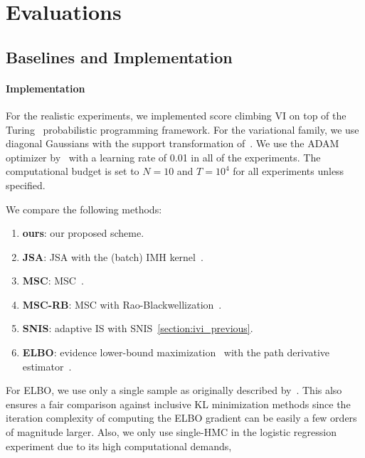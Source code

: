 \vspace{-0.05in}
\section{Evaluations}\label{section:eval}

\vspace{-0.05in}
\subsection{Baselines and Implementation}
\vspace{-0.05in}
\paragraph{Implementation}
For the realistic experiments, we implemented score climbing VI on top of the Turing~\citep{ge2018t} probabilistic programming framework.
For the variational family, we use diagonal Gaussians with the support transformation of~\citet{JMLR:v18:16-107}.
We use the ADAM optimizer by~\citet{kingma_adam_2015} with a learning rate of 0.01 in all of the experiments.
The computational budget is set to \(N=10\) and \(T=10^4\) for all experiments unless specified.

We compare the following methods:
\begin{enumerate}[noitemsep]
\item[\ding{182}] \textbf{ours}: our proposed scheme.
\item[\ding{183}] \textbf{JSA}: JSA with the (batch) IMH kernel~\citep{pmlr-v124-ou20a}.
\item[\ding{184}] \textbf{MSC}: MSC~\citep{NEURIPS2020_b2070693}.
\item[\ding{185}] \textbf{MSC-RB}: MSC with Rao-Blackwellization~\citep{NEURIPS2020_b2070693}.
\item[\ding{186}] \textbf{SNIS}: adaptive IS with SNIS~\cref{section:ivi_previous}.
\item[\ding{187}] \textbf{ELBO}: evidence lower-bound maximization~\citep{pmlr-v33-ranganath14, JMLR:v18:16-107} with the path derivative estimator~\citep{NIPS2017_e91068ff}.
\end{enumerate}
For ELBO, we use only a single sample as originally described by~\citet{NIPS2017_e91068ff}.
This also ensures a fair comparison against inclusive KL minimization methods since the iteration complexity of computing the ELBO gradient can be easily a few orders of magnitude larger.
Also, we only use single-HMC in the logistic regression experiment due to its high computational demands, 

